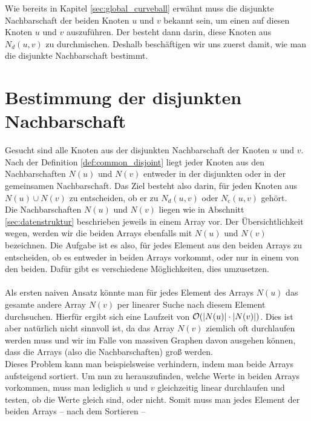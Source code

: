 Wie bereits in Kapitel \ref{sec:global_curveball} erwähnt muss die disjunkte Nachbarschaft
der beiden Knoten $u$ und $v$ bekannt sein, um einen \ct{} auf diesen Knoten $u$ und $v$
auszuführen. Der \ct{} besteht dann darin, diese Knoten aus $N_{d}(u,v)$ zu durchmischen.
Deshalb beschäftigen wir uns zuerst damit, wie man die disjunkte Nachbarschaft bestimmt.


\section{Bestimmung der disjunkten Nachbarschaft}
\label{sec:common}
Gesucht sind alle Knoten aus der disjunkten Nachbarschaft der Knoten $u$ und $v$.
Nach der Definition \ref{def:common_disjoint} liegt jeder Knoten aus den Nachbarschaften $N(u)$ und $N(v)$ 
entweder in der disjunkten oder in der gemeinsamen Nachbarschaft. Das Ziel besteht also darin, 
für jeden Knoten aus $N(u) \cup N(v)$ zu entscheiden, ob er zu $N_{d}(u,v)$ oder $N_{c}(u,v)$ gehört.
\\
Die Nachbarschaften $N(u)$ und $N(v)$ liegen wie in Abschnitt \ref{sec:datenstruktur} beschrieben jeweils
in einem Array vor. Der Übersichtlichkeit wegen, werden wir die beiden
Arrays ebenfalls mit $N(u)$ und $N(v)$ bezeichnen. Die Aufgabe ist es also,
 für jedes Element aus den beiden Arrays zu entscheiden,
ob es entweder in beiden Arrays vorkommt, oder nur in einem von den beiden. Dafür 
gibt es verschiedene Möglichkeiten, dies umzusetzen.
\\
\\
Als ersten naiven Ansatz könnte man für jedes Element des Arrays $N(u)$ das gesamte andere 
Array $N(v)$ per linearer Suche nach diesem Element durchsuchen. Hierfür ergibt sich eine Laufzeit von
$\mathcal{O}(|N(u)|\cdot|N(v)|)$. Dies ist aber natürlich nicht sinnvoll ist, da das Array $N(v)$ ziemlich oft 
durchlaufen werden muss und wir 
im Falle von massiven Graphen davon ausgehen können, dass die Arrays (also die Nachbarschaften)
 groß werden. 
\\
Dieses Problem kann man beispielsweise verhindern, indem man beide Arrays aufsteigend sortiert. 
Um nun zu herauszufinden,
welche Werte in beiden Arrays vorkommen, muss man lediglich $u$ und $v$ gleichzeitig linear durchlaufen
und testen, ob die Werte gleich sind, oder nicht. Somit muss man jedes Element der beiden Arrays -- nach dem Sortieren -- 
